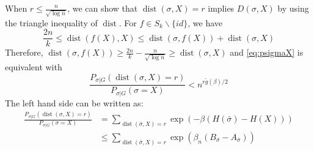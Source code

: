 \documentclass[journal]{IEEEtran}
\DeclareMathOperator{\dist}{dist}
\begin{document}
When $r\leq \frac{n}{\sqrt{\log n}}$, we can show that $\dist(\sigma, X) = r$ implies $D(\sigma, X)$ by using the triangle
inequality of $\dist$. For $f \in S_k \backslash \{ id \}$, we have
$$
\frac{2n}{k} \leq \dist(f(X), X) \leq \dist(\sigma, f(X)) + \dist(\sigma, X)
$$
Therefore, $\dist(\sigma, f(X)) \geq \frac{2n}{k} - \frac{n}{\sqrt{\log n}} \geq \dist(\sigma, X)$ and
\eqref{eq:psigmaX} is equivalent with
\begin{equation}\label{eq:psigmaX2}
\frac{P_{\sigma|G}(\dist(\sigma, X)=r)}
{P_{\sigma|G}(\sigma=X)} <
n^{r \tilde{g}(\beta) /2}
\end{equation}
The left hand side can be written as:
\begin{align*}
\frac{P_{\sigma|G}(\dist(\sigma, X)=r)}
{P_{\sigma|G}(\sigma=X)}  &= \sum_{\dist(\bar{\sigma}, X)=r}\exp(-\beta(H(\bar{\sigma})-H(X)))\\
&\leq \sum_{\dist(\bar{\sigma}, X)=r}\exp(\beta_n(B_{\bar{\sigma}}-A_{\bar{\sigma}}))
\end{align*}
\end{document}
